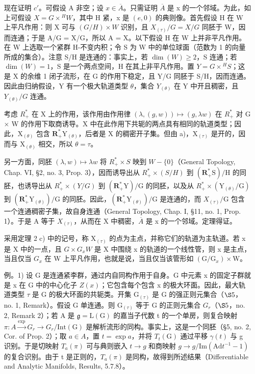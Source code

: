 现在证明 \(c'\)。可假设 A 非空；设 \(x \in \overline{A}\)。只需证明 \(\overline{A}\) 是 x 的一个邻域。为此，如上可假设 \(X = G \times {}^{H}W\)，其中 H 紧，x 是 \((e,0)\) 的典则像。首先假设 H 在 W 上平凡作用：则 X 可与 \((G/H) \times W\) 识别，且 \(X_{(\tau)}/G = X/G\) 同胚于 W，因而连通；于是 A/G = X/G，所以 A = X。以下假设 H 在 W 上并非平凡作用。在 W 上选取一个紧群 H-不变内积；令 S 为 W 中的单位球面（范数为 1 的向量所成的集合）。注意 S/H 是连通的：事实上，若 \(\dim(W) \geq 2\)，S 连通；若 \(\dim(W) = 1\)，S 是一个两点空间，H 在其上非平凡作用。置 \(Y = G \times {}^{H}S\)；这是 X 的余维 1 闭子流形，在 G 的作用下稳定，且 Y/G 同胚于 S/H，因而连通。因此由归纳假设，Y 有一个极大轨道类型 \(\theta\)，集合 \(Y_{(\theta)}\) 在 Y 中开且稠密，且 \(Y_{(\theta)}/G\) 连通。

考虑 \(R_{+}^{*}\) 在 X 上的作用，该作用由作用律 \((\lambda, (g, w)) \mapsto (g, \lambda w)\) 在 \(R_{+}^{*}\) 对 G × W 的作用下取商诱导。X 中在此作用下共轭的两点具有相同的轨道类型；因此，\(\mathrm{X}_{(\theta)}\) 包含 \(\mathbf{R}_{+}^{*}\mathrm{Y}_{(\theta)}\)，后者是 X 的稠密开子集。但由 a)，\(\mathrm{X}_{(\tau)}\) 是开的，因而与 \(\mathrm{X}_{(\theta)}\) 相交，所以 \(\theta = \tau\)。

另一方面，同胚 \((\lambda,w)\mapsto\lambda w\) 将 \(R_{+}^{*}\times S\) 映到 \(W-\{0\}\)（General Topology, Chap. VI, §2, no. 3, Prop. 3），因而诱导出从 \(R_{+}^{*}\times(S/H)\) 到 \((\mathbf{R}_{+}^{*}\mathrm{S})/\mathrm{H}\) 的同胚，也诱导出从 \(R_{+}^{*}\times(Y/G)\) 到 \((\mathbf{R}_{+}^{*}\mathrm{Y})/\mathrm{G}\) 的同胚，以及从 \(R_{+}^{*}\times(\mathrm{Y}_{(\theta)}/\mathrm{G})\) 到 \((\mathbf{R}_{+}^{*}\mathrm{Y}_{(\theta)})/\mathrm{G}\) 的同胚。因此，\((\mathbf{R}_{+}^{*}\mathrm{Y}_{(\theta)})/\mathrm{G}\) 是连通的，而 \(X_{(\tau)}/\mathrm{G}\) 包含一个连通稠密子集，故自身连通（General Topology, Chap. I, §11, no. 1, Prop. 1）。于是 A 等于 \(X_{(\tau)}\)，从而在 X 中稠密，\(\overline{A}\) 是 x 的一个邻域。定理得证。

采用定理 2 c) 中的记号，称 \(\mathrm{X}_{(\tau)}\) 的点为主点，并称它们的轨道为主轨道。若 x 是 X 中的一点，且 \(G \times G_{x}W\) 是 X 中围绕 x 的轨道的一个线性管，则 x 是主点，当且仅当 \(G_{x}\) 在 W 上平凡作用，也就是说，当且仅当该管形如 \((\mathrm{G}/\mathrm{G}_{x}) \times \mathrm{W}\)。

例。1) 设 G 是连通紧李群，通过内自同构作用于自身。G 中元素 x 的固定子群就是 x 在 G 中的中心化子 \(Z(x)\)；它包含每个包含 x 的极大环面。因此，最大轨道类型 \(\tau\) 是 G 的极大环面的共轭类。开集 \(\mathrm{G}_{(\tau)}\) 是 G 的强正则元集合（\(\S5\)，no. 1, Remark）。假设 G 单连通。则 \(\mathrm{G}_{(\tau)}\) 等于 G 的正则元集合 \(G_{r}\)（\(\S5\)，no. 2, Remark 2）；若 A 是 \(\mathfrak{g} = \mathrm{L}(\mathrm{G})\) 的嘉当子代数 t 的一个单房，则复合映射 \(\pi: A \xrightarrow{\exp} G_{r} \longrightarrow G_{r}/\mathrm{Int}(\mathrm{G})\) 是解析流形的同构。事实上，这是一个同胚（§5, no. 2, Cor. of Prop. 2）；取 \(a \in A\)，置 \(t = \exp a\)，并将 \(T_{t}(\mathrm{G})\) 通过平移 \(\gamma(t)\) 与 g 识别。于是切映射 \(T_{a}(\pi)\) 可与典则嵌入 \(t \to g\) 和商映射 \(g \to g/\mathrm{Im}(\mathrm{Ad} t^{-1} - 1)\) 的复合识别。由于 t 是正则的，\(T_{a}(\pi)\) 是同构，故得到所述结果（Differentiable and Analytic Manifolds, Results, 5.7.8）。

